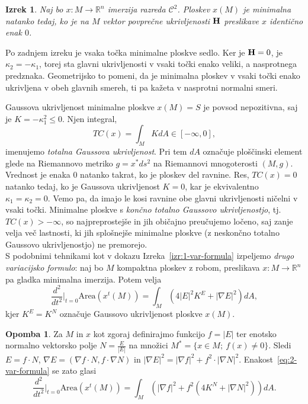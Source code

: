 \documentclass[12pt,a4paper,twoside]{article}
\theoremstyle{definition} %
\newtheorem{opomba}[definicija]{Opomba}
\theoremstyle{plain} %
\newtheorem{izrek}[definicija]{Izrek}
\numberwithin{equation}{section}  %
\newcommand{\R}{\mathbb R}
\begin{document}
\begin{izrek} \label{izr:min-ekviv-H=0}
Naj bo $x \colon M \to \R^{n}$ imerzija razreda $\mathcal{C}^2$. Ploskev $x(M)$ je minimalna natanko tedaj, ko je na $M$ vektor povprečne ukrivljenosti $\textbf{\textup{H}}$ preslikave $x$ identično enak $0$.
\end{izrek}

Po zadnjem izreku je vsaka točka minimalne ploskve sedlo. Ker je $\textup{\textbf{H}} = 0$, je $\kappa_2 = -\kappa_1$, torej sta glavni ukrivljenosti v vsaki točki enako veliki, a nasprotnega predznaka. Geometrijsko to pomeni, da je minimalna ploskev v vsaki točki enako ukrivljena v obeh glavnih smereh, ti pa kažeta v nasprotni normalni smeri.

Gaussova ukrivljenost minimalne ploskve $x(M)=S$ je povsod nepozitivna, saj je $K = -\kappa_{1}^2 \leq 0$.
Njen integral,
\begin{equation}
TC(x) = \int_{M} K dA \in [-\infty, 0],
\end{equation} 
imenujemo \emph{totalna Gaussova ukrivljenost}. Pri tem $dA$ označuje ploščinski element glede na Riemannovo metriko $g = x^{*}ds^2$ na Riemannovi mnogoterosti $(M,g)$.
Vrednost je enaka $0$ natanko takrat, ko je ploskev del ravnine. Res, $TC(x) = 0$ natanko tedaj, ko je Gaussova ukrivljenost $K=0$, kar je ekvivalentno $\kappa_1=\kappa_2=0$. Vemo pa, da imajo le kosi ravnine obe glavni ukrivljenosti ničelni v vsaki točki.
Minimalne ploskve s \emph{končno totalno Gaussovo ukrivljenostjo}, tj.~$TC(x) > -\infty$, so najpreprostejše in jih običajno preučujemo ločeno, saj zanje velja več lastnosti, ki jih splošnejše minimalne ploskve (z neskončno totalno Gaussovo ukrivljenostjo) ne premorejo.\\[0.1cm]

S podobnimi tehnikami kot v dokazu Izreka~\ref{izr:1-var-formula} izpeljemo \emph{drugo variacijsko formulo}: naj bo $M$ kompaktna ploskev z robom, preslikava $x \colon M \to \mathbb{R}^{n}$ pa gladka minimalna imerzija. Potem velja
\begin{equation} \label{eq:2-var-formula}
\frac{d^2}{dt^2} \Big|_{t=0} \text{Area} \left(x^{t}(M)\right) = \int_{M} {\left( 4|E|^{2} K^{E} + |\nabla{E}|^2 \right) dA},
\end{equation}
kjer $K^{E} = K^{N}$ označuje Gaussovo ukrivljenost ploskve $x(M)$.

\begin{opomba}
Za $M$ in $x$ kot zgoraj definirajmo funkcijo $f = |E|$ ter enotsko normalno vektorsko polje $N = \frac{E}{|E|}$ na množici $M^{*} = \{ x \in M ; \ f(x) \neq 0 \}$. Sledi $E = f \cdot N$, $\nabla E = (\nabla f \cdot N, f \cdot \nabla N)$ in $|\nabla E|^2 = |\nabla f|^2 + f^2 \cdot |\nabla N|^2$.
Enakost~\eqref{eq:2-var-formula} se zato glasi
\begin{equation}
\frac{d^2}{dt^2} \Big|_{t=0} \text{Area} \left(x^{t}(M)\right) = \int_{M} {\left( |\nabla f|^2 + f^2 (4K^{N} + |\nabla N|^2) \right) dA}.
\end{equation}
\end{opomba}
\end{document}
